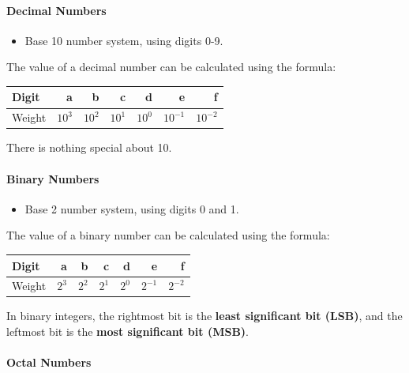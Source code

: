 \documentclass[
  a4paper,
]{article}
\providecommand{\tightlist}{%
  \setlength{\itemsep}{0pt}\setlength{\parskip}{0pt}}
\begin{document}
\paragraph{Decimal Numbers}\label{decimal-numbers}

\begin{itemize}
\tightlist
\item
  Base 10 number system, using digits 0-9.
\end{itemize}

The value of a decimal number can be calculated using the formula:

\begin{longtable}[]{@{}lrrrrrr@{}}
\toprule\noalign{}
Digit & a & b & c & d & e & f \\
\midrule\noalign{}
\endhead
\bottomrule\noalign{}
\endlastfoot
Weight & \(10^3\) & \(10^2\) & \(10^1\) & \(10^0\) & \(10^{-1}\) &
\(10^{-2}\) \\
\end{longtable}

There is nothing special about 10.

\paragraph{Binary Numbers}\label{binary-numbers}

\begin{itemize}
\tightlist
\item
  Base 2 number system, using digits 0 and 1.
\end{itemize}

The value of a binary number can be calculated using the formula:

\begin{longtable}[]{@{}lrrrrrr@{}}
\toprule\noalign{}
Digit & a & b & c & d & e & f \\
\midrule\noalign{}
\endhead
\bottomrule\noalign{}
\endlastfoot
Weight & \(2^3\) & \(2^2\) & \(2^1\) & \(2^0\) & \(2^{-1}\) &
\(2^{-2}\) \\
\end{longtable}

In binary integers, the rightmost bit is the \textbf{least significant
bit (LSB)}, and the leftmost bit is the \textbf{most significant bit
(MSB)}.

\paragraph{Octal Numbers}\label{octal-numbers}
\end{document}
